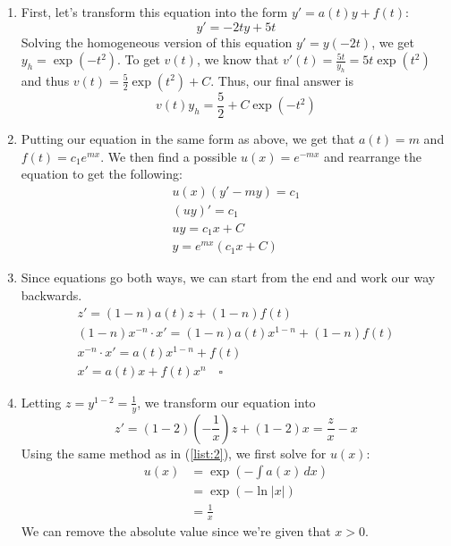 \documentclass[12pt]{article}
\begin{document}
\begin{enumerate}
    \item First, let's transform this equation into the form $y'=a(t)y+f(t)$:
          \[y'=-2ty+5t\]
          Solving the homogeneous version of this equation $y'=y(-2t)$, we get $y_h=\exp(-t^2)$.
          To get $v(t)$, we know that $v'(t)=\frac{5t}{y_h}=5t \exp(t^2)$ and thus $v(t)=\frac{5}{2}\exp(t^2)+C$.
          Thus, our final answer is \[v(t)y_h=\boxed{\frac{5}{2}+C\exp(-t^2)}\]
    \item Putting our equation in the same form as above, we get that $a(t)=m$ and $f(t)=c_1e^{mx}$.
          We then find a possible $u(x)=e^{-mx}$ and rearrange the equation to get the following: \label{list:2}
          \begin{gather*}
              u(x)(y'-my)=c_1 \\
              (uy)'=c_1 \\
              uy=c_1x+C \\
              \boxed{y=e^{mx}(c_1x+C)}
          \end{gather*}
    \item Since equations go both ways, we can start from the end and work our way backwards.
          \begin{gather*}
              z'=(1-n)a(t)z+(1-n)f(t) \\
              (1-n)x^{-n} \cdot x'=(1-n)a(t)x^{1-n}+(1-n)f(t) \\
              x^{-n} \cdot x' = a(t)x^{1-n}+f(t) \\
              x'=a(t)x+f(t)x^n \quad \square
          \end{gather*}
    \item Letting $z=y^{1-2}=\frac{1}{y}$, we transform our equation into
          \[z'=(1-2)\left(-\frac{1}{x}\right)z+(1-2)x=\frac{z}{x}-x\]
          Using the same method as in (\ref{list:2}), we first solve for $u(x)$:
          \begin{align*}
              u(x) & =\exp\left(-\int a(x)\,dx\right) \\
                   & =\exp(-\ln |x|)                  \\
                   & =\frac{1}{x}
          \end{align*}
          We can remove the absolute value since we're given that $x>0$.


\end{enumerate}
\end{document}
